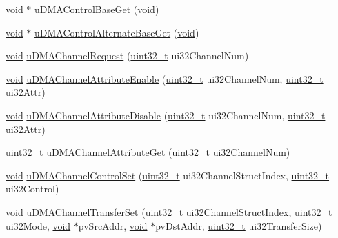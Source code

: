 \begin{DoxyCompactItemize}
\hyperlink{usb__devapi_8h_afabf60e7f57651d6d595a02c75f07cd0}{void} $\ast$ \hyperlink{group__udma__api_ga09c51018a10f41216497396e4ec5a6fd}{u\+D\+M\+A\+Control\+Base\+Get} (\hyperlink{usb__devapi_8h_afabf60e7f57651d6d595a02c75f07cd0}{void})
\item 
\hyperlink{usb__devapi_8h_afabf60e7f57651d6d595a02c75f07cd0}{void} $\ast$ \hyperlink{group__udma__api_ga3d755ac6e59821949a57d1ceca7082ae}{u\+D\+M\+A\+Control\+Alternate\+Base\+Get} (\hyperlink{usb__devapi_8h_afabf60e7f57651d6d595a02c75f07cd0}{void})
\item 
\hyperlink{usb__devapi_8h_afabf60e7f57651d6d595a02c75f07cd0}{void} \hyperlink{group__udma__api_ga1020903cbcc5a03434c3f5c13f252a72}{u\+D\+M\+A\+Channel\+Request} (\hyperlink{_p_e___types_8h_a33594304e786b158f3fb30289278f5af}{uint32\+\_\+t} ui32\+Channel\+Num)
\item 
\hyperlink{usb__devapi_8h_afabf60e7f57651d6d595a02c75f07cd0}{void} \hyperlink{group__udma__api_gadcd88d930702b3773952214e27bba3f6}{u\+D\+M\+A\+Channel\+Attribute\+Enable} (\hyperlink{_p_e___types_8h_a33594304e786b158f3fb30289278f5af}{uint32\+\_\+t} ui32\+Channel\+Num, \hyperlink{_p_e___types_8h_a33594304e786b158f3fb30289278f5af}{uint32\+\_\+t} ui32\+Attr)
\item 
\hyperlink{usb__devapi_8h_afabf60e7f57651d6d595a02c75f07cd0}{void} \hyperlink{group__udma__api_ga687745cb1ba10bcfbaac4bf0bbfd4132}{u\+D\+M\+A\+Channel\+Attribute\+Disable} (\hyperlink{_p_e___types_8h_a33594304e786b158f3fb30289278f5af}{uint32\+\_\+t} ui32\+Channel\+Num, \hyperlink{_p_e___types_8h_a33594304e786b158f3fb30289278f5af}{uint32\+\_\+t} ui32\+Attr)
\item 
\hyperlink{_p_e___types_8h_a33594304e786b158f3fb30289278f5af}{uint32\+\_\+t} \hyperlink{group__udma__api_ga741cac245ca559d1a1112077a7f46b8c}{u\+D\+M\+A\+Channel\+Attribute\+Get} (\hyperlink{_p_e___types_8h_a33594304e786b158f3fb30289278f5af}{uint32\+\_\+t} ui32\+Channel\+Num)
\item 
\hyperlink{usb__devapi_8h_afabf60e7f57651d6d595a02c75f07cd0}{void} \hyperlink{group__udma__api_ga6f73ab006ff6a593eeeb947130bbdf6f}{u\+D\+M\+A\+Channel\+Control\+Set} (\hyperlink{_p_e___types_8h_a33594304e786b158f3fb30289278f5af}{uint32\+\_\+t} ui32\+Channel\+Struct\+Index, \hyperlink{_p_e___types_8h_a33594304e786b158f3fb30289278f5af}{uint32\+\_\+t} ui32\+Control)
\item 
\hyperlink{usb__devapi_8h_afabf60e7f57651d6d595a02c75f07cd0}{void} \hyperlink{group__udma__api_ga938c21dc70cb6e11e6eb826de0fa21c3}{u\+D\+M\+A\+Channel\+Transfer\+Set} (\hyperlink{_p_e___types_8h_a33594304e786b158f3fb30289278f5af}{uint32\+\_\+t} ui32\+Channel\+Struct\+Index, \hyperlink{_p_e___types_8h_a33594304e786b158f3fb30289278f5af}{uint32\+\_\+t} ui32\+Mode, \hyperlink{usb__devapi_8h_afabf60e7f57651d6d595a02c75f07cd0}{void} $\ast$pv\+Src\+Addr, \hyperlink{usb__devapi_8h_afabf60e7f57651d6d595a02c75f07cd0}{void} $\ast$pv\+Dst\+Addr, \hyperlink{_p_e___types_8h_a33594304e786b158f3fb30289278f5af}{uint32\+\_\+t} ui32\+Transfer\+Size)

\end{DoxyCompactItemize}

